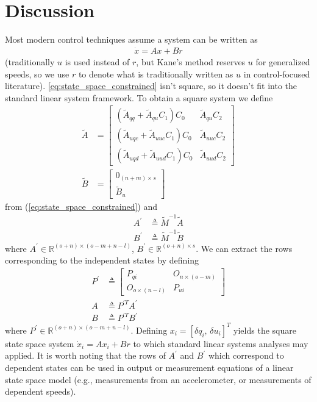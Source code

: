 \section{Discussion}
\label{sec:discussion}
Most modern control techniques assume a system can be written as
\begin{align}
\dot{x} = Ax + Br
\end{align}
(traditionally $u$ is used instead of $r$, but Kane's method reserves $u$ for
generalized speeds, so we use $r$ to denote what is traditionally written as $u$
in control-focused literature). \autoref{eq:state_space_constrained} isn't
square, so it doesn't fit into the standard linear system framework. To obtain
a square system we define
\begin{align}
\tilde{A} &=
   \left[
     \begin{array}{cc}
       (\tilde{A}_{qq} + \tilde{A}_{qu} C_1 ) C_0 & \tilde{A}_{qu} C_2 \\
       (\tilde{A}_{uqc} + \tilde{A}_{uuc} C_1 ) C_0 & \tilde{A}_{uuc} C_2\\
       (\tilde{A}_{uqd} + \tilde{A}_{uud} C_1 ) C_0 & \tilde{A}_{uud} C_2
     \end{array}
   \right]\\
\tilde{B} &= 
    \left[
      \begin{array}{c}
        0_{(n+m) \times s} \\
        \tilde{B}_{u}
      \end{array}
    \right]
\end{align}
from (\ref{eq:state_space_constrained}) and
\begin{align}
  \label{eq:A_prime}
    A^\prime &\triangleq \tilde{M}^{-1} \tilde{A} \\
  \label{eq:B_prime}
    B^\prime &\triangleq \tilde{M}^{-1} \tilde{B}
\end{align}
where  $A^\prime \in \mathbb{R}^{(o + n) \times (o - m + n -l)}$, $B^\prime \in
\mathbb{R}^{(o + n) \times s}$.  We can extract the rows corresponding to the
independent states by defining
\begin{align}
  \label{eq:P_prime}
    P^\prime &\triangleq \begin{bmatrix}
        P_{qi} & O_{n \times (o - m)} \\
        O_{o \times (n - l)} & P_{ui}
    \end{bmatrix} \\
  \label{eq:A}
    A &\triangleq P^{\prime T} A^\prime \\
  \label{eq:B}
    B &\triangleq P^{\prime T} B^\prime
\end{align}
where $P^\prime \in \mathbb{R}^{(o + n) \times (o - m + n - l)}$.  Defining
$x_i = \left[\delta q_i,\,\delta u_i\right]^{T}$ yields the square state space
system $\dot{x}_i = A x_i + B r$ to which standard linear systems analyses may
applied. It is worth noting that the rows of $A^\prime$ and $B^\prime$ which
correspond to dependent states can be used in output or measurement equations
of a linear state space model (e.g., measurements from an accelerometer, or
measurements of dependent speeds).

